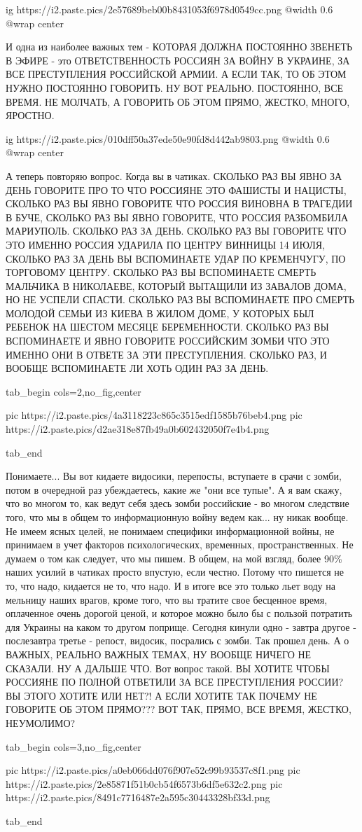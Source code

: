 \ifcmt
  ig https://i2.paste.pics/2e57689beb00b8431053f6978d0549cc.png
  @width 0.6
  @wrap center
\fi

И одна из наиболее важных тем - КОТОРАЯ ДОЛЖНА ПОСТОЯННО ЗВЕНЕТЬ В ЭФИРЕ - это
ОТВЕТСТВЕННОСТЬ РОССИЯН ЗА ВОЙНУ В УКРАИНЕ, ЗА ВСЕ ПРЕСТУПЛЕНИЯ РОССИЙСКОЙ
АРМИИ. А ЕСЛИ ТАК, ТО ОБ ЭТОМ НУЖНО ПОСТОЯННО ГОВОРИТЬ. НУ ВОТ РЕАЛЬНО.
ПОСТОЯННО, ВСЕ ВРЕМЯ. НЕ МОЛЧАТЬ, А ГОВОРИТЬ ОБ ЭТОМ ПРЯМО, ЖЕСТКО, МНОГО,
ЯРОСТНО.

\ifcmt
  ig https://i2.paste.pics/010dff50a37ede50e90fd8d442ab9803.png
  @width 0.6
  @wrap center
\fi

А теперь повторяю вопрос. Когда вы в чатиках. СКОЛЬКО РАЗ ВЫ ЯВНО ЗА ДЕНЬ
ГОВОРИТЕ ПРО ТО ЧТО РОССИЯНЕ ЭТО ФАШИСТЫ И НАЦИСТЫ, СКОЛЬКО РАЗ ВЫ ЯВНО
ГОВОРИТЕ ЧТО РОССИЯ ВИНОВНА В ТРАГЕДИИ В БУЧЕ, СКОЛЬКО РАЗ ВЫ ЯВНО ГОВОРИТЕ,
ЧТО РОССИЯ РАЗБОМБИЛА МАРИУПОЛЬ. СКОЛЬКО РАЗ ЗА ДЕНЬ. СКОЛЬКО РАЗ ВЫ ГОВОРИТЕ
ЧТО ЭТО ИМЕННО РОССИЯ УДАРИЛА ПО ЦЕНТРУ ВИННИЦЫ 14 ИЮЛЯ, СКОЛЬКО РАЗ ЗА ДЕНЬ ВЫ
ВСПОМИНАЕТЕ УДАР ПО КРЕМЕНЧУГУ, ПО ТОРГОВОМУ ЦЕНТРУ. СКОЛЬКО РАЗ ВЫ ВСПОМИНАЕТЕ
СМЕРТЬ МАЛЬЧИКА В НИКОЛАЕВЕ, КОТОРЫЙ ВЫТАЩИЛИ ИЗ ЗАВАЛОВ ДОМА, НО НЕ УСПЕЛИ
СПАСТИ. СКОЛЬКО РАЗ ВЫ ВСПОМИНАЕТЕ ПРО СМЕРТЬ МОЛОДОЙ СЕМЬИ ИЗ КИЕВА В ЖИЛОМ
ДОМЕ, У КОТОРЫХ БЫЛ РЕБЕНОК НА ШЕСТОМ МЕСЯЦЕ БЕРЕМЕННОСТИ. СКОЛЬКО РАЗ ВЫ
ВСПОМИНАЕТЕ И ЯВНО ГОВОРИТЕ РОССИЙСКИМ ЗОМБИ ЧТО ЭТО ИМЕННО ОНИ В ОТВЕТЕ ЗА ЭТИ
ПРЕСТУПЛЕНИЯ. СКОЛЬКО РАЗ, И ВООБЩЕ ВСПОМИНАЕТЕ ЛИ ХОТЬ ОДИН РАЗ ЗА ДЕНЬ.

\ifcmt
  tab_begin cols=2,no_fig,center

     pic https://i2.paste.pics/4a3118223c865c3515edf1585b76beb4.png
     pic https://i2.paste.pics/d2ae318e87fb49a0b602432050f7e4b4.png

  tab_end
\fi

Понимаете... Вы вот кидаете видосики, перепосты, вступаете в срачи с зомби,
потом в очередной раз убеждаетесь, какие же "они все тупые". А я вам скажу, что
во многом то, как ведут себя здесь зомби российские - во многом следствие того,
что мы в общем то информационную войну ведем как... ну никак вообще. Не имеем
ясных целей, не понимаем специфики информационной войны, не принимаем в учет
факторов психологических, временных, пространственных. Не думаем о том как
следует, что мы пишем. В общем, на мой взгляд, более 90\% наших усилий в чатиках
просто впустую, если честно. Потому что пишется не то, что надо, кидается не
то, что надо. И в итоге все это только льет воду на мельницу наших врагов,
кроме того, что вы тратите свое бесценное время, оплаченное очень дорогой
ценой, и которое можно было бы с пользой потратить для Украины на каком то
другом поприще.  Сегодня кинули одно - завтра другое - послезавтра третье -
репост, видосик, посрались с зомби. Так прошел день. А о ВАЖНЫХ, РЕАЛЬНО ВАЖНЫХ
ТЕМАХ, НУ ВООБЩЕ НИЧЕГО НЕ СКАЗАЛИ. НУ А ДАЛЬШЕ ЧТО. Вот вопрос такой. ВЫ
ХОТИТЕ ЧТОБЫ РОССИЯНЕ ПО ПОЛНОЙ ОТВЕТИЛИ ЗА ВСЕ ПРЕСТУПЛЕНИЯ РОССИИ? ВЫ ЭТОГО
ХОТИТЕ ИЛИ НЕТ?! А ЕСЛИ ХОТИТЕ ТАК ПОЧЕМУ НЕ ГОВОРИТЕ ОБ ЭТОМ ПРЯМО??? ВОТ ТАК,
ПРЯМО, ВСЕ ВРЕМЯ, ЖЕСТКО, НЕУМОЛИМО?


\ifcmt
  tab_begin cols=3,no_fig,center

     pic https://i2.paste.pics/a0eb066dd076f907e52c99b93537c8f1.png
		 pic https://i2.paste.pics/2e85871f51b0cb54f6573b6df5e632c2.png
		 pic https://i2.paste.pics/8491c7716487e2a595c30443328bf33d.png

  tab_end
\fi
